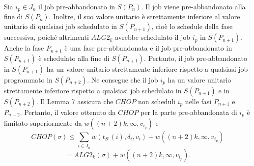 \documentclass[twoside,openany,titlepage,fleqn,
	headinclude,12pt,a4paper,BCOR5mm,footinclude]{scrbook}
\begin{document}
Sia $i_{p} \in J_{n}$ il job pre-abbandonato in $S(P_{n})$. Il job viene pre-abbandonato alla fine di $S(P_{n})$. Inoltre, il suo valore unitario è strettamente inferiore al valore unitario di qualsiasi job schedulato in $S(P_{n+1})$, cioè lo schedule della fase successiva, poiché altrimenti $ALG2_{k}$ avrebbe schedulato il job $i_{p}$ in $S(P_{n+1})$. Anche la fase $P_{n+1}$ è una fase pre-abbandonata e il job pre-abbandonato in $S (P_{n+1})$ è schedulato alla fine di $S(P_{n+1})$. Pertanto, il job pre-abbandonato in $S(P_{n+1})$ ha un valore unitario strettamente inferiore rispetto a qualsiasi job programmato in $S(P_{n + 2})$. Ne consegue che il job $i_{p}$ ha un valore unitario strettamente inferiore rispetto a qualsiasi job schedulato in $S (P_{n+1})$ e in $S (P_{n+2})$. Il Lemma 7 assicura che $CHOP$ non scheduli $i_{p}$ nelle fasi $P_{n+1}$ e $P_{n+2}$. Pertanto, il valore ottenuto da $CHOP$ per la parte pre-abbandonata di $i_{p}$  è limitato superiormente da $w((n + 2) k, \infty, v_{i_{p}})$ e
$$CHOP(\sigma) \leq \sum_{i \in J_{n}} w(t_{S'}(i), \delta_{i}, v_{i}) + w((n + 2)k, \infty, v_{i_{p}})$$ 
$$ = ALG2_{k}(\sigma) + w((n + 2)k, \infty , v_{i_{p}}).$$
\end{document}
